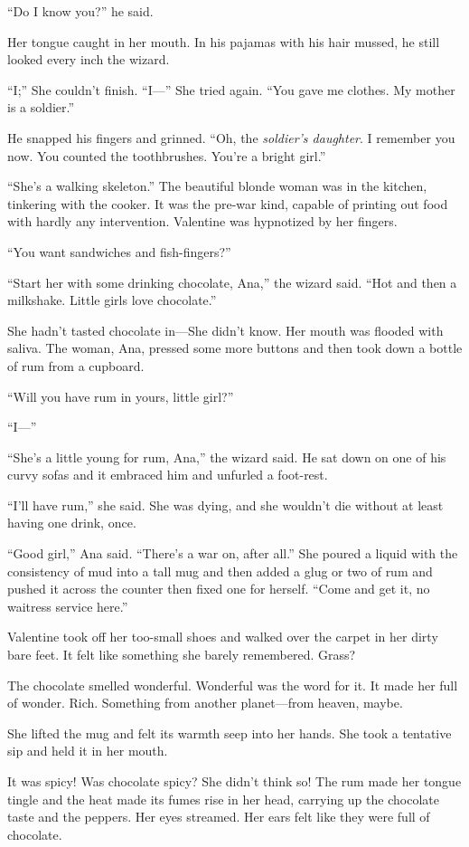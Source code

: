 “Do I know you?” he said.

Her tongue caught in her mouth. In his pajamas with his hair
mussed, he still looked every inch the wizard.

“I;” She couldn’t finish. “I—” She tried again. “You gave me
clothes. My mother is a soldier.”

He snapped his fingers and grinned. “Oh, the
\emph{soldier’s daughter}. I remember you now. You counted the
toothbrushes. You’re a bright girl.”

“She’s a walking skeleton.” The beautiful blonde woman was in the
kitchen, tinkering with the cooker. It was the pre-war kind,
capable of printing out food with hardly any intervention.
Valentine was hypnotized by her fingers.

“You want sandwiches and fish-fingers?”

“Start her with some drinking chocolate, Ana,” the wizard said.
“Hot and then a milkshake. Little girls love chocolate.”

She hadn’t tasted chocolate in—She didn’t know. Her mouth was
flooded with saliva. The woman, Ana, pressed some more buttons and
then took down a bottle of rum from a cupboard.

“Will you have rum in yours, little girl?”

“I—”

“She’s a little young for rum, Ana,” the wizard said. He sat down
on one of his curvy sofas and it embraced him and unfurled a
foot-rest.

“I’ll have rum,” she said. She was dying, and she wouldn’t die
without at least having one drink, once.

“Good girl,” Ana said. “There’s a war on, after all.” She poured a
liquid with the consistency of mud into a tall mug and then added a
glug or two of rum and pushed it across the counter then fixed one
for herself. “Come and get it, no waitress service here.”

Valentine took off her too-small shoes and walked over the carpet
in her dirty bare feet. It felt like something she barely
remembered. Grass?

The chocolate smelled wonderful. Wonderful was the word for it. It
made her full of wonder. Rich. Something from another planet—from
heaven, maybe.

She lifted the mug and felt its warmth seep into her hands. She
took a tentative sip and held it in her mouth.

It was spicy! Was chocolate spicy? She didn’t think so! The rum
made her tongue tingle and the heat made its fumes rise in her
head, carrying up the chocolate taste and the peppers. Her eyes
streamed. Her ears felt like they were full of chocolate.

